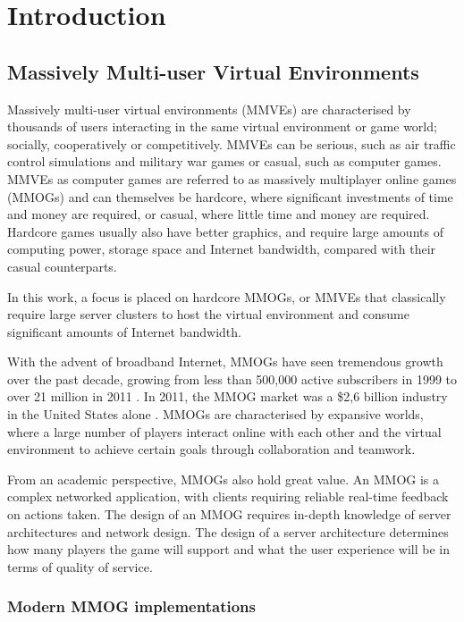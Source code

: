 \chapter{Introduction}
\label{chp:INTRO}



\section{Massively Multi-user Virtual Environments}

Massively multi-user virtual environments (MMVEs) are characterised by thousands of users interacting in the same virtual environment or game world; socially, cooperatively or competitively. MMVEs can be serious, such as air traffic control simulations and military war games or casual, such as computer games. MMVEs as computer games are referred to as massively multiplayer online games (MMOGs) and can themselves be hardcore, where significant investments of time and money are required, or casual, where little time and money are required. Hardcore games usually also have better graphics, and require large amounts of computing power, storage space and Internet bandwidth, compared with their casual counterparts.

In this work, a focus is placed on hardcore MMOGs, or MMVEs that classically require large server clusters to host the virtual environment and consume significant amounts of Internet bandwidth.

With the advent of broadband Internet, MMOGs have seen tremendous growth over the past decade, growing from less than 500,000 active subscribers in 1999 to over 21 million in 2011 \cite{mmo_growth_chart}. In 2011, the MMOG market was a \$2,6 billion industry in the United States alone \cite{newzoo_mmo_report}. MMOGs are characterised by expansive worlds, where a large number of players interact online with each other and the virtual environment to achieve certain goals through collaboration and teamwork.

From an academic perspective, MMOGs also hold great value. An MMOG is a complex networked application, with clients requiring reliable real-time feedback on actions taken. The design of an MMOG requires in-depth knowledge of server architectures and network design. The design of a server architecture determines how many players the game will support and what the user experience will be in terms of quality of service.

\subsection{Modern MMOG implementations}
\label{modern_mmogs}

